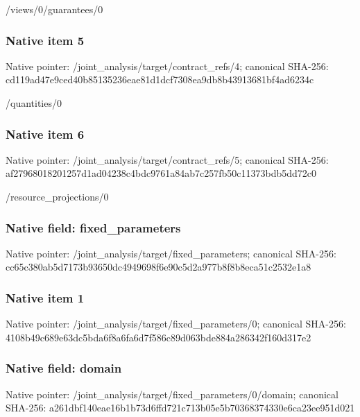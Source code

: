 \documentclass[10pt,a4paper]{article}
\begin{document}
\begingroup\raggedright\sloppy /\allowbreak{}views/\allowbreak{}0/\allowbreak{}guarantees/\allowbreak{}0\par\endgroup

\subsubsection{Native item 5}
Native pointer: /joint\_\allowbreak{}analysis/target/contract\_\allowbreak{}refs/4; canonical SHA-256: cd119ad47e9ced40b85135236eae81d1dcf7308ea9db8b43913681bf4ad6234c

\begingroup\raggedright\sloppy /\allowbreak{}quantities/\allowbreak{}0\par\endgroup

\subsubsection{Native item 6}
Native pointer: /joint\_\allowbreak{}analysis/target/contract\_\allowbreak{}refs/5; canonical SHA-256: af27968018201257d1ad04238c4bdc9761a84ab7c257fb50c11373bdb5dd72c0

\begingroup\raggedright\sloppy /\allowbreak{}resource\_\allowbreak{}projections/\allowbreak{}0\par\endgroup

\subsubsection{Native field: fixed\_\allowbreak{}parameters}
Native pointer: /joint\_\allowbreak{}analysis/target/fixed\_\allowbreak{}parameters; canonical SHA-256: cc65c380ab5d7173b93650dc4949698f6e90c5d2a977b8f8b8eca51c2532e1a8

\subsubsection{Native item 1}
Native pointer: /joint\_\allowbreak{}analysis/target/fixed\_\allowbreak{}parameters/0; canonical SHA-256: 4108b49c689e63dc5bda6f8a6fa6d7f586c89d063bde884a286342f160d317e2

\subsubsection{Native field: domain}
Native pointer: /joint\_\allowbreak{}analysis/target/fixed\_\allowbreak{}parameters/0/domain; canonical SHA-256: a261dbf140eae16b1b73d6ffd721c713b05e5b70368374330e6ca23ee951d021
\end{document}
